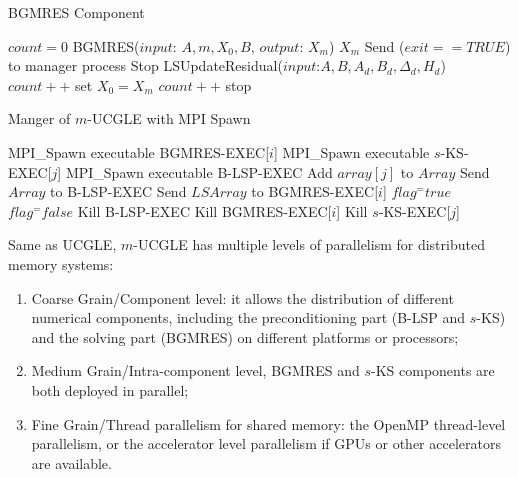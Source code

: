 \begin{algorithm}[h]
	\caption{BGMRES Component}   
	\begin{algorithmic}[1]
		\State $count=0$
		\State BGMRES{($input$: $A, m, X_0,B$, $output$: $X_m$)}
		\State \Return $X_m$
		\State Send ($exit==TRUE$) to manager process
		\State Stop
		\Else {}
		\State LSUpdateResidual($input$:$A, B, A_d, B_d, \Delta_d, H_d$)
		\State $count++$
		\EndIf
		\Else
		\State set $X_0=X_m$
		\State $count++$
		\EndIf
		\EndIf
		\State stop \EndIf
		\EndFunction
	\end{algorithmic}  
	\label{bgmresc}
\end{algorithm}

\begin{algorithm}[htbp]
	\caption{Manger of $m$-UCGLE with MPI Spawn}   
	\label{alg:ucmgle}   
	\begin{algorithmic}[1]
		\State MPI\_Spawn executable BGMRES-EXEC[$i$]
		\EndFor
		\State MPI\_Spawn executable $s$-KS-EXEC[$j$]
		\EndFor
		\State MPI\_Spawn executable B-LSP-EXEC
		\State Add $array[j]$ to $Array$
		\EndIf
		\EndFor
		\State Send $Array$ to B-LSP-EXEC
		\EndIf
		\State Send $LSArray$ to BGMRES-EXEC[$i$]
		\EndFor
		\EndIf
		\State $flag ^= true$
		\Else
		\State $flag ^= false$
		\EndIf
		\EndIf
		\EndFor
		\State Kill B-LSP-EXEC
		\State Kill BGMRES-EXEC[$i$]
		\EndFor
		\State Kill $s$-KS-EXEC[$j$]
		\EndFor
		\EndIf
		\EndFunction
		
	\end{algorithmic}  
\end{algorithm}


Same as UCGLE, $m$-UCGLE has multiple levels of parallelism for distributed memory systems:

\begin{enumerate}
	\item Coarse Grain/Component level: it allows the distribution of different numerical components, including the preconditioning part (B-LSP and $s$-KS) and the solving part (BGMRES) on different platforms or processors;
	\item Medium Grain/Intra-component level, BGMRES and $s$-KS components are both deployed in parallel;
	\item Fine Grain/Thread parallelism for shared memory: the OpenMP thread-level parallelism, or the accelerator level parallelism if GPUs or other accelerators are available.
\end{enumerate} 

